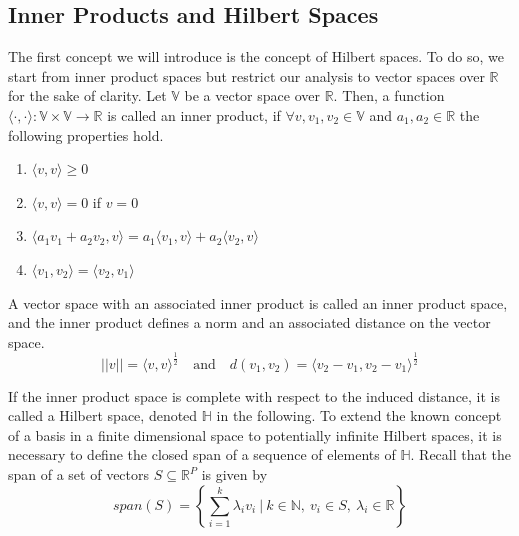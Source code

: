 \documentclass[11pt,twoside,a4paper]{article}
\begin{document}
	\subsection{Inner Products and Hilbert Spaces}
	The first concept we will introduce is the concept of Hilbert spaces. To do so, we start from inner product spaces but restrict our analysis to vector spaces over $\mathbb{R}$ for the sake of clarity. Let $\mathbb{V}$ be a vector space over $\mathbb{R}$.  Then, a function $\langle \cdot, \cdot \rangle : \mathbb{V} \times  \mathbb{V} \rightarrow \mathbb{R}$ is called an inner product, if $\forall v, v_1, v_2 \in \mathbb{V}$ and $a_1, a_2 \in \mathbb{R}$ the following properties hold.
	
	\begin{multicols}{2}
		\begin{enumerate}
			\item $\langle v, v \rangle \geq 0$
			\item $\langle v, v \rangle = 0$ if $v = 0$
			\item $\langle a_1 v_1 + a_2 v_2, v \rangle = a_1 \langle v_1, v \rangle + a_2 \langle v_2, v \rangle$
			\item $\langle v_1, v_2 \rangle = \langle v_2, v_1 \rangle$
		\end{enumerate}
	\end{multicols}

	A vector space with an associated inner product is called an inner product space, and the inner product defines a norm and an associated distance on the vector space.
	\begin{equation}
		\lvert \lvert v \rvert \rvert = {\langle v, v \rangle}^{\frac{1}{2}} \quad \text{and} \quad 
		d(v_1, v_2) = {\langle v_2 - v_1, v_2 - v_1 \rangle}^{\frac{1}{2}}
	\end{equation}
	
	If the inner product space is complete with respect to the induced distance, it is called a Hilbert space, denoted $\mathbb{H}$ in the following. To extend the known concept of a basis in a finite dimensional space to potentially infinite Hilbert spaces, it is necessary to define the closed span of a sequence of elements of $\mathbb{H}$. Recall that the span of a set of vectors $S \subseteq \mathbb{R}^P$ is given by
	\begin{equation}
		span(S) = \left\{\sum_{i = 1}^{k} \lambda_i v_i \: \bigg\vert \: k \in \mathbb{N}, \: v_i \in S, \: \lambda_i \in \mathbb{R} \right\}
	\end{equation}
			
\end{document}
